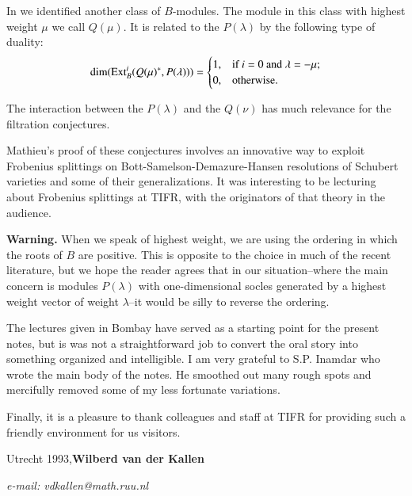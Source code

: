 In \cite{key35} we identified another class of $B$-modules. The module
in this class with highest weight $\mu$ we call $Q(\mu)$. It is
related to the $P(\lambda)$ by the following type of duality:
$$
\dim(\operatorname{Ext}^{i}_{B}(Q(\mu)^{*},P(\lambda)))=
\begin{cases}
1, & \text{if~ } i=0\text{~ and~ } \lambda=-\mu;\\
0, & \text{otherwise.}
\end{cases}
$$

The interaction between the $P(\lambda)$ and the $Q(\nu)$ has much
relevance for the filtration conjectures.

Mathieu's proof of these conjectures involves an innovative way to
exploit Frobenius splittings on Bott-Samelson-Demazure-Hansen
resolutions of Schubert varieties and some of their
generalizations. It was interesting to be lecturing about Frobenius
splittings at TIFR, with the originators of that theory in the
audience.

\medskip
\noindent
{\bf Warning.} When we speak of highest weight, we are using the
ordering in which the roots of $B$ are positive. This is opposite to
the choice in much of the recent literature, but we hope the reader
agrees that in our situation--where the main concern is modules
$P(\lambda)$ with one-dimensional socles generated by a highest weight
vector of weight $\lambda$--it would be silly to reverse the
ordering. 

The lectures given in Bombay have served as a starting point for the
present notes, but is was not a straightforward job to convert the
oral story into something organized and intelligible. I am very
grateful to S.P. Inamdar who wrote the main body of the notes. He
smoothed out many rough spots and mercifully removed some of my less
fortunate variations.

Finally, it is a pleasure to thank colleagues and staff at TIFR for
providing such a friendly environment for us visitors.
\vskip 2cm

\noindent
Utrecht 1993,\hfill {\large\bf Wilberd van der Kallen}

\hfill {\em e-mail: vdkallen@math.ruu.nl}


